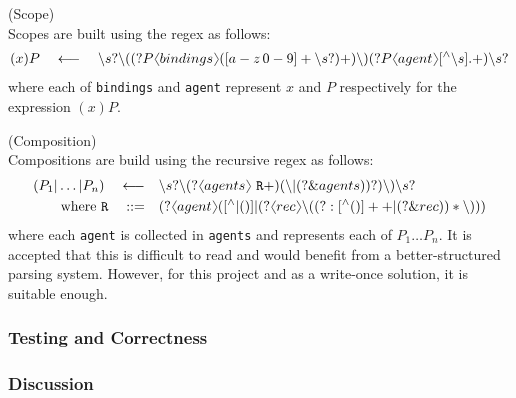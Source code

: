         \begin{definition}{(Scope)\\}
            Scopes are built using the regex as follows:
            \begin{align*}
                (x)P \quad \longleftarrow \quad \backslash s? \backslash ((?P \langl bindings \rangl([a-z \, 0-9]+ \backslash s?)+)\backslash )(?P\langl agent \rangl[^{\wedge}\backslash s].+)\backslash s?
            \end{align*}
            where each of \texttt{bindings} and \texttt{agent} represent $x$ and $P$ respectively for the expression $(x) P$.
        \end{definition}

        \begin{definition}{(Composition)\\}
            Compositions are build using the recursive regex as follows:
            \begin{align*}
                (P_1 | \ldots | P_n) \quad \longleftarrow \quad & \backslash s? \backslash (?\langl agents\rangl~\texttt{R}+) (\backslash | (?\&agents))?)\backslash )\backslash s? \\
                \text{where } \texttt{R} \quad \defeq \quad & (?\langl agent\rangl([^{\wedge}|()] | (?\langl rec\rangl\backslash ((?:[^{\wedge}()]++|(?\&rec))*\backslash )))
            \end{align*}
            where each \texttt{agent} is collected in \texttt{agents} and represents each of $P_1 \ldots P_n$.
            It is accepted that this is difficult to read and would benefit from a better-structured parsing system.
            However, for this project and as a write-once solution, it is suitable enough.
        \end{definition}


    \subsubsection{Testing and Correctness}
    \subsubsection{Discussion}
